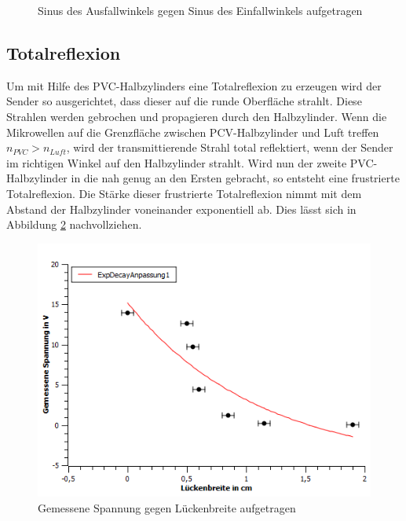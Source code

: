 \begin{figure}[H]
\centering

\caption{Sinus des Ausfallwinkels gegen Sinus des Einfallwinkels aufgetragen}
\label{fig:n}
\end{figure}


\subsection{Totalreflexion}
Um mit Hilfe des PVC-Halbzylinders eine Totalreflexion zu erzeugen wird der Sender so ausgerichtet, dass dieser  auf die runde Oberfläche strahlt. Diese Strahlen werden gebrochen und propagieren durch den Halbzylinder.
Wenn die Mikrowellen auf die Grenzfläche zwischen PCV-Halbzylinder und Luft treffen $ n_{PVC}>n_{Luft} $, wird der transmittierende Strahl total reflektiert, wenn der Sender im richtigen Winkel auf den Halbzylinder strahlt.
Wird nun der zweite PVC-Halbzylinder in die nah genug an den Ersten gebracht, so entsteht eine frustrierte Totalreflexion.
Die Stärke dieser frustrierte Totalreflexion nimmt mit dem Abstand der Halbzylinder voneinander exponentiell ab. Dies lässt sich in Abbildung \ref{fig:frust} nachvollziehen.
\begin{figure}[H]
\centering
\includegraphics[width=0.9\linewidth]{./diagramme/frust_totalr_ohne_titel}
\caption{Gemessene Spannung gegen Lückenbreite aufgetragen}
\label{fig:frust}
\end{figure}

